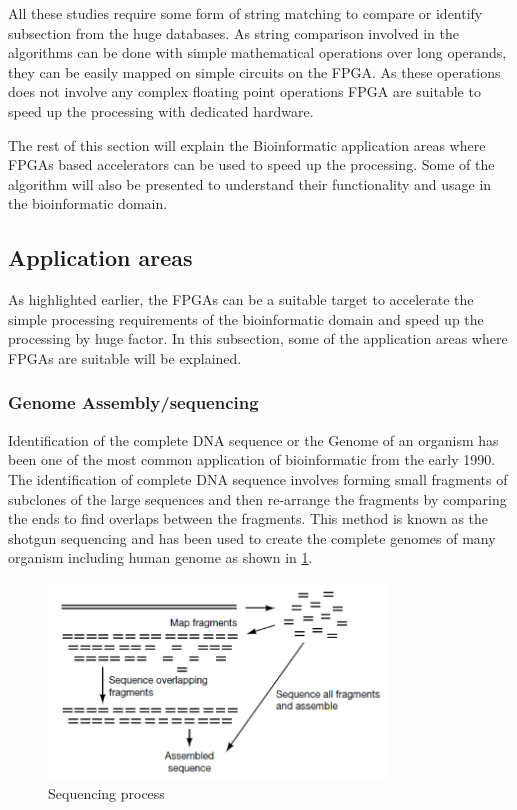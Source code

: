 \documentclass[12pt,twoside]{article}
\begin{document}
All these studies require some form of string matching to compare or identify subsection from the huge
databases. As string comparison involved in the algorithms can be done with simple mathematical
operations over long operands, they can be easily mapped on simple circuits on the FPGA. As these
operations does not involve any complex floating point operations FPGA are suitable to speed up the
processing with dedicated hardware.

The rest of this section will explain the Bioinformatic application areas where FPGAs based accelerators
can be used to speed up the processing. Some of the algorithm will also be presented to understand their
functionality and usage in the bioinformatic domain.

\subsection{Application areas}

As highlighted earlier, the FPGAs can be a suitable target to accelerate the simple processing requirements
of the bioinformatic domain and speed up the processing by huge factor. In this subsection, some of the
application areas where FPGAs are suitable will be explained.

\subsubsection{Genome Assembly/sequencing}

Identification of the complete DNA sequence or the Genome of an organism has been one of the most common
application of bioinformatic from the early 1990. The identification of complete DNA sequence involves
forming small fragments of subclones of the large sequences and then re-arrange the fragments by comparing
the ends to find overlaps between the fragments\cite[Chapter 2, Genome sequencing]{mount_bioinformatics:_2004}.
This method is known as the shotgun sequencing and has been used to create the complete genomes of many organism
including human genome as shown in \cref{fig:sequence}.

\begin{figure}%
    \centering
    \includegraphics[width=0.8\textwidth]{fig/sequence}
    \caption{Sequencing process \cite[Figure 2.4]{mount_bioinformatics:_2004}}
    \label{fig:sequence}
\end{figure}
\end{document}
